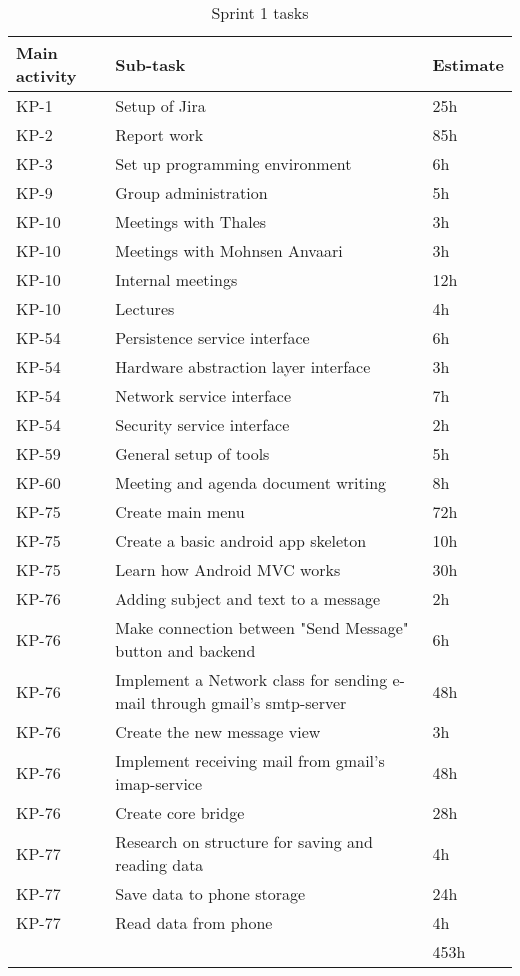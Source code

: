 \begin{table}
\begin{tabularx}{\linewidth}{>{\setlength\hsize{.2\hsize}}X|>{\setlength\hsize{1.5\hsize}}X|>{\setlength\hsize{.1\hsize}}X}
\textbf{Main activity} &  \textbf{Sub-task} & \textbf{Estimate}\\ \hline \hline
KP-1 & Setup of Jira & 25h\\ \hline
KP-2 & Report work & 85h\\ \hline
KP-3 & Set up programming environment & 6h\\ \hline
KP-9 & Group administration & 5h\\ \hline
KP-10 & Meetings with Thales & 3h\\ \hline
KP-10 & Meetings with Mohnsen Anvaari & 3h\\ \hline
KP-10 & Internal meetings & 12h\\ \hline
KP-10 & Lectures & 4h\\ \hline
KP-54 & Persistence service interface & 6h\\ \hline
KP-54 & Hardware abstraction layer interface & 3h\\ \hline
KP-54 & Network service interface & 7h\\ \hline
KP-54 & Security service interface & 2h\\ \hline
KP-59 & General setup of tools & 5h\\ \hline
KP-60 & Meeting and agenda document writing & 8h\\ \hline
KP-75 & Create main menu & 72h\\ \hline
KP-75 & Create a basic android app skeleton & 10h\\ \hline
KP-75 & Learn how Android MVC works & 30h\\ \hline
KP-76 & Adding subject and text to a message & 2h\\ \hline
KP-76 & Make connection between "Send Message" button and backend & 6h\\ \hline
KP-76 & Implement a Network class for sending e-mail through gmail's smtp-server & 48h\\ \hline
KP-76 & Create the new message view & 3h\\ \hline
KP-76 & Implement receiving mail from gmail's imap-service & 48h\\ \hline
KP-76 & Create core bridge & 28h\\ \hline
KP-77 & Research on structure for saving and reading data & 4h\\ \hline
KP-77 & Save data to phone storage & 24h\\ \hline
KP-77 & Read data from phone & 4h\\ \hline
 &  & 453h
\end{tabularx}
\caption{Sprint 1 tasks} \label{tab:sprint1tasks}
\end{table}